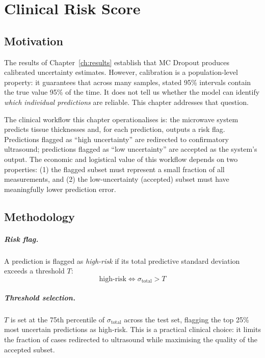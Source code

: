 \documentclass[12pt, a4paper, oneside]{report}
\begin{document}
\chapter{Clinical Risk Score}
\label{ch:risk}

\section{Motivation}

The results of Chapter~\ref{ch:results} establish that MC Dropout produces calibrated uncertainty estimates. However, calibration is a population-level property: it guarantees that across many samples, stated 95\% intervals contain the true value 95\% of the time. It does not tell us whether the model can identify \emph{which individual predictions} are reliable. This chapter addresses that question.

The clinical workflow this chapter operationalises is: the microwave system predicts tissue thicknesses and, for each prediction, outputs a risk flag. Predictions flagged as ``high uncertainty'' are redirected to confirmatory ultrasound; predictions flagged as ``low uncertainty'' are accepted as the system's output. The economic and logistical value of this workflow depends on two properties: (1) the flagged subset must represent a small fraction of all measurements, and (2) the low-uncertainty (accepted) subset must have meaningfully lower prediction error.

\section{Methodology}

\paragraph{Risk flag.} A prediction is flagged as \emph{high-risk} if its total predictive standard deviation exceeds a threshold $T$:
\begin{equation}
  \text{high-risk} \iff \sigma_{\mathrm{total}} > T
\end{equation}

\paragraph{Threshold selection.} $T$ is set at the 75th percentile of $\sigma_{\mathrm{total}}$ across the test set, flagging the top 25\% most uncertain predictions as high-risk. This is a practical clinical choice: it limits the fraction of cases redirected to ultrasound while maximising the quality of the accepted subset.
\end{document}
